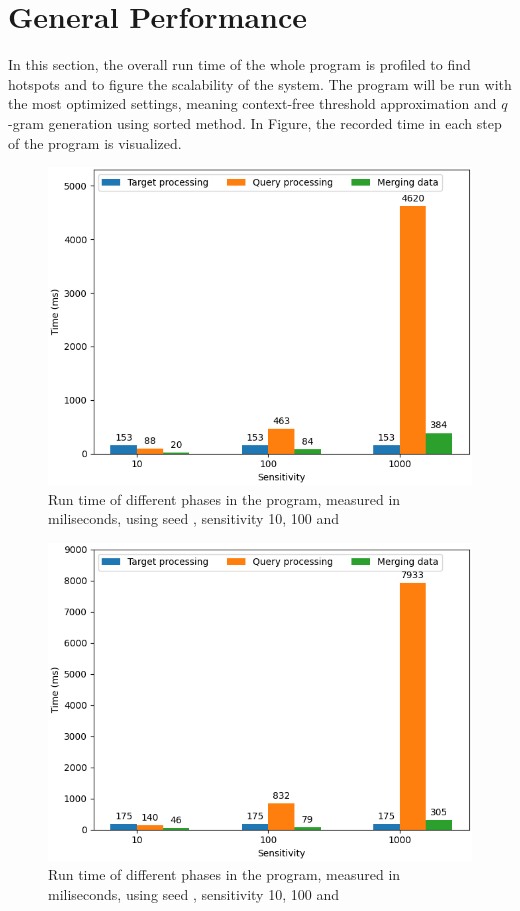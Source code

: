 \documentclass[twoside,a4paper,bsc]{master}
\newcommand{\Qgram}[1]{\(#1\)-gram}
\begin{document}
\section{General Performance}
In this section, the overall run time of the whole program is profiled to
find hotspots and to figure the scalability of the system. The program will
be run with the most optimized settings, meaning context-free threshold
approximation and \Qgram{q} generation using sorted method. In Figure, the
recorded time in each step of the program is visualized.
\begin{figure}
\centering
\includegraphics[scale=0.6]{graphics/program_w6.png}
\caption{Run time of different phases in the program, measured in
miliseconds,
using seed , sensitivity 10, 100 and }
\label{fig:genw7}
\end{figure}
\begin{figure}
\centering
\includegraphics[scale=0.6]{graphics/program_w7.png}
\caption{Run time of different phases in the program, measured in
miliseconds,
using seed , sensitivity 10, 100 and }
\label{fig:genw7}
\end{figure}
\end{document}

